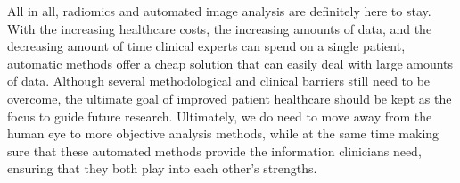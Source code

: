 All in all, radiomics and automated image analysis are definitely here to stay.
With the increasing healthcare costs, the increasing amounts of data, and the decreasing amount of time clinical experts can spend on a single patient, automatic methods offer a cheap solution that can easily deal with large amounts of data.
Although several methodological and clinical barriers still need to be overcome, the ultimate goal of improved patient healthcare should be kept as the focus to guide future research.
Ultimately, we do need to move away from the human eye to more objective analysis methods, while at the same time making sure that these automated methods provide the information clinicians need, ensuring that they both play into each other's strengths.
